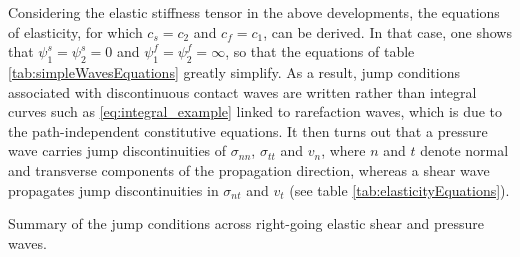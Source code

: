 \begin{remark}
  \label{rq:coupled_components}
  Considering the elastic stiffness tensor in the above developments, the equations of elasticity, for which $c_s=c_2$ and $c_f=c_1$, can be derived.
  In that case, one shows that $\psi^s_1=\psi^s_2=0$ and $\psi^f_1=\psi^f_2=\infty$, so that the equations of table \ref{tab:simpleWavesEquations} greatly simplify.
  As a result, jump conditions associated with discontinuous contact waves are written rather than integral curves such as \eqref{eq:integral_example} linked to rarefaction waves, which is due to the path-independent constitutive equations.
  It then turns out that a pressure wave carries jump discontinuities of $\sigma_{nn}$, $\sigma_{tt}$ and $v_n$, where $n$ and $t$ denote normal and transverse components of the propagation direction, whereas a shear wave propagates jump discontinuities in $\sigma_{nt}$ and $v_t$ (see table \ref{tab:elasticityEquations}).
\end{remark}
\begin{table*}[h!]
  \centering
  
  \caption{Summary of the jump conditions across right-going elastic shear and pressure waves.}
  \label{tab:elasticityEquations}
\end{table*}




